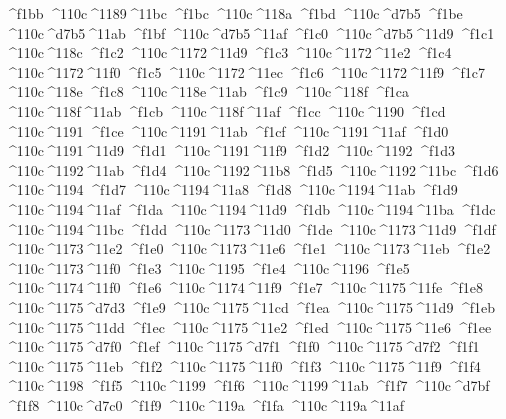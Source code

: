 \checkit ^^^^f1bb ^^^^110c^^^^1189^^^^11bc
\checkit ^^^^f1bc ^^^^110c^^^^118a
\checkit ^^^^f1bd ^^^^110c^^^^d7b5
\checkit ^^^^f1be ^^^^110c^^^^d7b5^^^^11ab
\checkit ^^^^f1bf ^^^^110c^^^^d7b5^^^^11af
\checkit ^^^^f1c0 ^^^^110c^^^^d7b5^^^^11d9
\checkit ^^^^f1c1 ^^^^110c^^^^118c
\checkit ^^^^f1c2 ^^^^110c^^^^1172^^^^11d9
\checkit ^^^^f1c3 ^^^^110c^^^^1172^^^^11e2
\checkit ^^^^f1c4 ^^^^110c^^^^1172^^^^11f0
\checkit ^^^^f1c5 ^^^^110c^^^^1172^^^^11ec
\checkit ^^^^f1c6 ^^^^110c^^^^1172^^^^11f9
\checkit ^^^^f1c7 ^^^^110c^^^^118e
\checkit ^^^^f1c8 ^^^^110c^^^^118e^^^^11ab
\checkit ^^^^f1c9 ^^^^110c^^^^118f
\checkit ^^^^f1ca ^^^^110c^^^^118f^^^^11ab
\checkit ^^^^f1cb ^^^^110c^^^^118f^^^^11af
\checkit ^^^^f1cc ^^^^110c^^^^1190
\checkit ^^^^f1cd ^^^^110c^^^^1191
\checkit ^^^^f1ce ^^^^110c^^^^1191^^^^11ab
\checkit ^^^^f1cf ^^^^110c^^^^1191^^^^11af
\checkit ^^^^f1d0 ^^^^110c^^^^1191^^^^11d9
\checkit ^^^^f1d1 ^^^^110c^^^^1191^^^^11f9
\checkit ^^^^f1d2 ^^^^110c^^^^1192
\checkit ^^^^f1d3 ^^^^110c^^^^1192^^^^11ab
\checkit ^^^^f1d4 ^^^^110c^^^^1192^^^^11b8
\checkit ^^^^f1d5 ^^^^110c^^^^1192^^^^11bc
\checkit ^^^^f1d6 ^^^^110c^^^^1194
\checkit ^^^^f1d7 ^^^^110c^^^^1194^^^^11a8
\checkit ^^^^f1d8 ^^^^110c^^^^1194^^^^11ab
\checkit ^^^^f1d9 ^^^^110c^^^^1194^^^^11af
\checkit ^^^^f1da ^^^^110c^^^^1194^^^^11d9
\checkit ^^^^f1db ^^^^110c^^^^1194^^^^11ba
\checkit ^^^^f1dc ^^^^110c^^^^1194^^^^11bc
\checkit ^^^^f1dd ^^^^110c^^^^1173^^^^11d0
\checkit ^^^^f1de ^^^^110c^^^^1173^^^^11d9
\checkit ^^^^f1df ^^^^110c^^^^1173^^^^11e2
\checkit ^^^^f1e0 ^^^^110c^^^^1173^^^^11e6
\checkit ^^^^f1e1 ^^^^110c^^^^1173^^^^11eb
\checkit ^^^^f1e2 ^^^^110c^^^^1173^^^^11f0
\checkit ^^^^f1e3 ^^^^110c^^^^1195
\checkit ^^^^f1e4 ^^^^110c^^^^1196
\checkit ^^^^f1e5 ^^^^110c^^^^1174^^^^11f0
\checkit ^^^^f1e6 ^^^^110c^^^^1174^^^^11f9
\checkit ^^^^f1e7 ^^^^110c^^^^1175^^^^11fe
\checkit ^^^^f1e8 ^^^^110c^^^^1175^^^^d7d3
\checkit ^^^^f1e9 ^^^^110c^^^^1175^^^^11cd
\checkit ^^^^f1ea ^^^^110c^^^^1175^^^^11d9
\checkit ^^^^f1eb ^^^^110c^^^^1175^^^^11dd
\checkit ^^^^f1ec ^^^^110c^^^^1175^^^^11e2
\checkit ^^^^f1ed ^^^^110c^^^^1175^^^^11e6
\checkit ^^^^f1ee ^^^^110c^^^^1175^^^^d7f0
\checkit ^^^^f1ef ^^^^110c^^^^1175^^^^d7f1
\checkit ^^^^f1f0 ^^^^110c^^^^1175^^^^d7f2
\checkit ^^^^f1f1 ^^^^110c^^^^1175^^^^11eb
\checkit ^^^^f1f2 ^^^^110c^^^^1175^^^^11f0
\checkit ^^^^f1f3 ^^^^110c^^^^1175^^^^11f9
\checkit ^^^^f1f4 ^^^^110c^^^^1198
\checkit ^^^^f1f5 ^^^^110c^^^^1199
\checkit ^^^^f1f6 ^^^^110c^^^^1199^^^^11ab
\checkit ^^^^f1f7 ^^^^110c^^^^d7bf
\checkit ^^^^f1f8 ^^^^110c^^^^d7c0
\checkit ^^^^f1f9 ^^^^110c^^^^119a
\checkit ^^^^f1fa ^^^^110c^^^^119a^^^^11af

